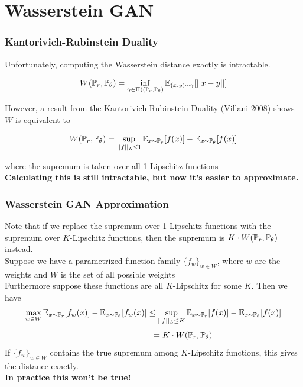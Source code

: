 \documentclass{beamer}
\begin{document}
\section{Wasserstein GAN}
\begin{frame}
\tableofcontents[currentsection]
\end{frame}

\begin{frame}
\frametitle{Kantorivich-Rubinstein Duality}
Unfortunately, computing the Wasserstein distance exactly is intractable.

$$ W(\P_{r},\P_{\theta}) = \inf_{\gamma \in \Pi((\P_{r},\P_{\theta})} \E_{(x,y) \sim \gamma} [ ||x-y|| ] $$

\pause
However, a result from the Kantorivich-Rubinstein Duality (Villani 2008)  shows $W$ is equivalent to

$$ W(\P_{r},\P_{\theta}) = \sup_{||f||_{L} \leq 1} \E_{x \sim \P_{r}}[f(x)] - \E_{x \sim \P_{\theta}}[f(x)] $$

where the supremum is taken over all 1-Lipschitz functions\\ \vspace{0.2in}
\pause
\textbf{Calculating this is still intractable, but now it's easier to approximate.}

\end{frame}

\begin{frame}
\frametitle{Wasserstein GAN Approximation}
\pause
Note that if we replace the supremum over 1-Lipschitz functions with the supremum over $K$-Lipschitz functions, then the supremum is $K \cdot W(\P_{r},\P_{\theta})$ instead.\\
\pause
\vspace{0.12in}
Suppose we have a parametrized function family $\{f_{w}\}_{w \in W}$, where $w$ are the weights and $W$ is the set of all possible weights\\
\vspace{0.12in}
Furthermore suppose these functions are all $K$-Lipschitz for some $K$. \pause Then we have
\vspace{-0.07in}
$$\max_{w \in W} \E_{x \sim \P_{r}}[f_{w}(x)] - \E_{x \sim \P_{\theta}}[f_{w}(x)] \leq \sup_{||f||_{L} \leq K} \E_{x \sim \P_{r}}[f(x)] - \E_{x \sim \P_{\theta}}[f(x)]$$
$$ \hspace{1in}= K \cdot W(\P_{r},\P_{\theta})$$
\pause
If $\{f_{w}\}_{w \in W}$ contains the true supremum among $K$-Lipschitz functions, this gives the distance exactly.\\
\vspace{0.1in}
\pause
\textbf{In practice this won't be true!}


\end{frame}
\end{document}
